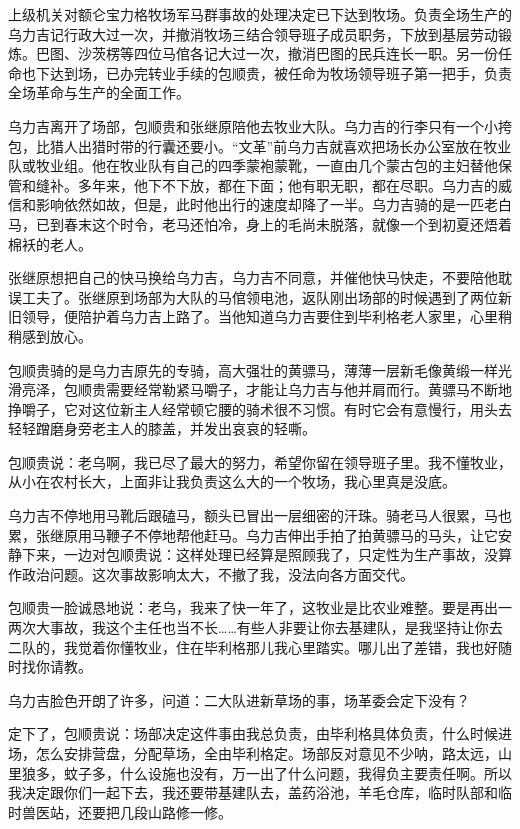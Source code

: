 \par 上级机关对额仑宝力格牧场军马群事故的处理决定已下达到牧场。负责全场生产的乌力吉记行政大过一次，并撤消牧场三结合领导班子成员职务，下放到基层劳动锻炼。巴图、沙茨楞等四位马倌各记大过一次，撤消巴图的民兵连长一职。另一份任命也下达到场，已办完转业手续的包顺贵，被任命为牧场领导班子第一把手，负责全场革命与生产的全面工作。
\par 乌力吉离开了场部，包顺贵和张继原陪他去牧业大队。乌力吉的行李只有一个小挎包，比猎人出猎时带的行囊还要小。“文革”前乌力吉就喜欢把场长办公室放在牧业队或牧业组。他在牧业队有自己的四季蒙袍蒙靴，一直由几个蒙古包的主妇替他保管和缝补。多年来，他下不下放，都在下面；他有职无职，都在尽职。乌力吉的威信和影响依然如故，但是，此时他出行的速度却降了一半。乌力吉骑的是一匹老白马，已到春末这个时令，老马还怕冷，身上的毛尚未脱落，就像一个到初夏还焐着棉袄的老人。
\par 张继原想把自己的快马换给乌力吉，乌力吉不同意，并催他快马快走，不要陪他耽误工夫了。张继原到场部为大队的马倌领电池，返队刚出场部的时候遇到了两位新旧领导，便陪护着乌力吉上路了。当他知道乌力吉要住到毕利格老人家里，心里稍稍感到放心。
\par 包顺贵骑的是乌力吉原先的专骑，高大强壮的黄骠马，薄薄一层新毛像黄缎一样光滑亮泽，包顺贵需要经常勒紧马嚼子，才能让乌力吉与他并肩而行。黄骠马不断地挣嚼子，它对这位新主人经常顿它腰的骑术很不习惯。有时它会有意慢行，用头去轻轻蹭磨身旁老主人的膝盖，并发出哀哀的轻嘶。
\par 包顺贵说：老乌啊，我已尽了最大的努力，希望你留在领导班子里。我不懂牧业，从小在农村长大，上面非让我负责这么大的一个牧场，我心里真是没底。
\par 乌力吉不停地用马靴后跟磕马，额头已冒出一层细密的汗珠。骑老马人很累，马也累，张继原用马鞭子不停地帮他赶马。乌力吉伸出手拍了拍黄骠马的马头，让它安静下来，一边对包顺贵说：这样处理已经算是照顾我了，只定性为生产事故，没算作政治问题。这次事故影响太大，不撤了我，没法向各方面交代。
\par 包顺贵一脸诚恳地说：老乌，我来了快一年了，这牧业是比农业难整。要是再出一两次大事故，我这个主任也当不长……有些人非要让你去基建队，是我坚持让你去二队的，我觉着你懂牧业，住在毕利格那儿我心里踏实。哪儿出了差错，我也好随时找你请教。
\par 乌力吉脸色开朗了许多，问道：二大队进新草场的事，场革委会定下没有？
\par 定下了，包顺贵说：场部决定这件事由我总负责，由毕利格具体负责，什么时候进场，怎么安排营盘，分配草场，全由毕利格定。场部反对意见不少呐，路太远，山里狼多，蚊子多，什么设施也没有，万一出了什么问题，我得负主要责任啊。所以我决定跟你们一起下去，我还要带基建队去，盖药浴池，羊毛仓库，临时队部和临时兽医站，还要把几段山路修一修。
